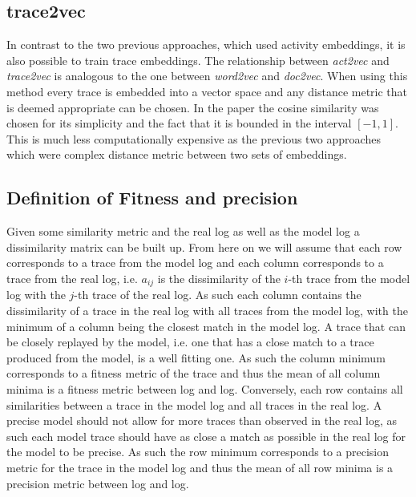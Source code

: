 \documentclass[runningheads]{template/llncs}
\begin{document}

\subsection{trace2vec}
In contrast to the two previous approaches, which used activity embeddings, it is also possible to train trace embeddings.
The relationship between \emph{act2vec} and \emph{trace2vec} is analogous to the one between \emph{word2vec} and \emph{doc2vec}.
When using this method every trace is embedded into a vector space and any distance metric that is deemed appropriate can be chosen.
In the paper the cosine similarity  was chosen for its simplicity and the fact that it is bounded in the interval $[-1,1]$.
This is much less computationally expensive as the previous two approaches which were complex distance metric between two sets of embeddings.

\subsection{Definition of Fitness and precision}
Given some similarity metric and the real log as well as the model log a dissimilarity matrix can be built up.
From here on we will assume that each row corresponds to a trace from the model log and each column corresponds to a trace from the real log, i.e. $a_{ij}$ is the dissimilarity of the $i$-th trace from the model log with the $j$-th trace of the real log.
As such each column contains the dissimilarity of a trace in the real log with all traces from the model log, with the minimum of a column being the closest match in the model log.
A trace that can be closely replayed by the model, i.e. one that has a close match to a trace produced from the model, is a well fitting one.
As such the column minimum corresponds to a fitness metric of the trace and thus the mean of all column minima is a fitness metric between log and log.
Conversely, each row contains all similarities between a trace in the model log and all traces in the real log.
A precise model should not allow for more traces than observed in the real log, as such each model trace should have as close a match as possible in the real log for the model to be precise.
As such the row minimum corresponds to a precision metric for the trace in the model log and thus the mean of all row minima is a precision metric between log and log.
\end{document}

